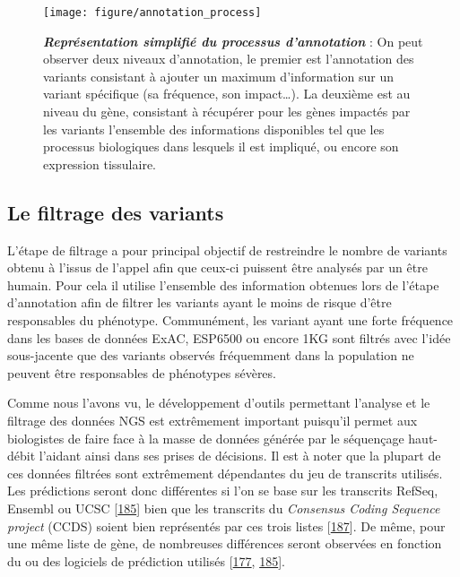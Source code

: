 \documentclass[12pt,a4paper,twoside]{ugathesis}
\theoremstyle{definition}
\theoremstyle{definition}
\theoremstyle{definition}
\theoremstyle{remark}
\begin{document}
\begin{figure}

{\centering \texttt{[image: figure/annotation\_process]} 

}

\caption[Représentation simplifié du processus d'annotation]{\textbf{\emph{Représentation simplifié du processus
d'annotation}} : On peut observer deux niveaux d'annotation, le premier
est l'annotation des variants consistant à ajouter un maximum
d'information sur un variant spécifique (sa fréquence, son
impact\ldots{}). La deuxième est au niveau du gène, consistant à
récupérer pour les gènes impactés par les variants l'ensemble des
informations disponibles tel que les processus biologiques dans lesquels
il est impliqué, ou encore son expression tissulaire.}\label{fig:pictannot}
\end{figure}










\newpage

\subsection{Le filtrage des variants}\label{le-filtrage-des-variants}

L'étape de filtrage a pour principal objectif de restreindre le nombre
de variants obtenu à l'issus de l'appel afin que ceux-ci puissent être
analysés par un être humain. Pour cela il utilise l'ensemble des
information obtenues lors de l'étape d'annotation afin de filtrer les
variants ayant le moins de risque d'être responsables du phénotype.
Communément, les variant ayant une forte fréquence dans les bases de
données ExAC, ESP6500 ou encore 1KG sont filtrés avec l'idée
sous-jacente que des variants observés fréquemment dans la population ne
peuvent être responsables de phénotypes sévères.

Comme nous l'avons vu, le développement d'outils permettant l'analyse et
le filtrage des données NGS est extrêmement important puisqu'il permet
aux biologistes de faire face à la masse de données générée par le
séquençage haut-débit l'aidant ainsi dans ses prises de décisions. Il
est à noter que la plupart de ces données filtrées sont extrêmement
dépendantes du jeu de transcrits utilisés. Les prédictions seront donc
différentes si l'on se base sur les transcrits RefSeq, Ensembl ou UCSC
{[}\protect\hyperlink{ref-McCarthy2014}{185}{]} bien que les transcrits
du \emph{Consensus Coding Sequence project} (CCDS) soient bien
représentés par ces trois listes
{[}\protect\hyperlink{ref-Pruitt2009}{187}{]}. De même, pour une même
liste de gène, de nombreuses différences seront observées en fonction du
ou des logiciels de prédiction utilisés
{[}\protect\hyperlink{ref-Salgado2016}{177},
\protect\hyperlink{ref-McCarthy2014}{185}{]}.
\end{document}
